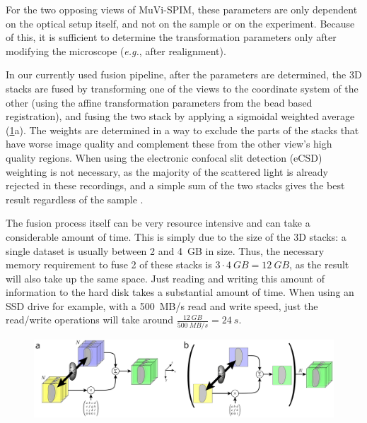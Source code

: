 For the two opposing views of MuVi-SPIM, these parameters are only dependent on the optical setup itself, and not on the sample or on the experiment. Because of this, it is sufficient to determine the transformation parameters only after modifying the microscope (\textit{e.g.}, after realignment).

In our currently used fusion pipeline, after the parameters are determined, the 3D stacks are fused by transforming one of the views to the coordinate system of the other (using the affine transformation parameters from the bead based registration), and fusing the two stack by applying a sigmoidal weighted average (\ref{fig:acquisition}a). The weights are determined in a way to exclude the parts of the stacks that have worse image quality and complement these from the other view's high quality regions. When using the electronic confocal slit detection (eCSD) weighting is not necessary, as the majority of the scattered light is already rejected in these recordings, and a simple sum of the two stacks gives the best result regardless of the sample \cite{de_medeiros_confocal_2015}.

The fusion process itself can be very resource intensive and can take a considerable amount of time. This is simply due to the size of the 3D stacks: a single dataset is usually between 2 and \SI{4}{GB} in size. Thus, the necessary memory requirement to fuse 2 of these stacks is $3\cdot \SI{4}{GB} = \SI{12}{GB}$, as the result will also take up the same space. Just reading and writing this amount of information to the hard disk takes a substantial amount of time. When using an SSD drive for example, with a \SI{500}{MB/s} read and write speed, just the read/write operations will take around $\frac{\SI{12}{GB}}{\SI{500}{MB/s}} = \SI{24}{s}$.


\begin{figure}
  \centering
  \includegraphics[width=1\columnwidth]{fusion/acquisition}
  \label{fig:acquisition}
\end{figure}

